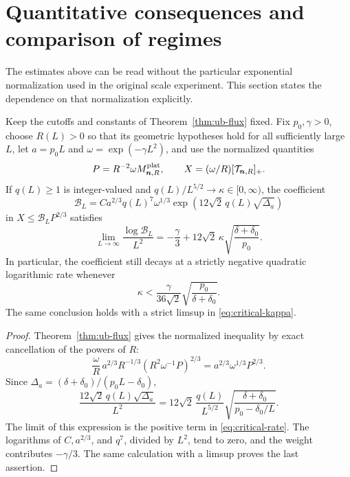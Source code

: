 \section{Quantitative consequences and comparison of regimes}
\label{sec:consequences}

The estimates above can be read without the particular exponential
normalization used in the original scale experiment. This section states
the dependence on that normalization explicitly.

\begin{corollary}
\label{cor:critical-coefficient}
Keep the cutoffs and constants of Theorem~\ref{thm:ub-flux} fixed.
Fix \(p_0,\gamma>0\), choose \(R(L)>0\) so that its geometric
hypotheses hold for all sufficiently large \(L\), let \(a=p_0L\) and
\(\omega=\exp(-\gamma L^2)\), and use the normalized quantities
\[
 P=R^{-2}\omega M^{\rm plat}_{\boldsymbol n,R},
 \qquad X=(\omega/R)[\mathcal T_{\boldsymbol n,R}]_+.
\]
If \(q(L)\ge1\) is integer-valued and
\(q(L)/L^{5/2}\to\kappa\in[0,\infty)\), the coefficient
\[
 \mathcal B_L
 =C a^{2/3}q(L)^7\omega^{1/3}
          \exp(12\sqrt2\,q(L)\sqrt{\Delta_a})
\]
in \(X\le\mathcal B_LP^{2/3}\) satisfies
\begin{equation}\label{eq:critical-rate}
 \lim_{L\to\infty}\frac{\log\mathcal B_L}{L^2}
 =-\frac{\gamma}{3}
       +12\sqrt2\,\kappa\sqrt{\frac{\delta+\delta_0}{p_0}}.
\end{equation}
In particular, the coefficient still decays at a strictly negative
quadratic logarithmic rate whenever
\begin{equation}\label{eq:critical-kappa}
 \kappa<
 \frac{\gamma}{36\sqrt2}
           \sqrt{\frac{p_0}{\delta+\delta_0}}.
\end{equation}
The same conclusion holds with a strict limsup in
\eqref{eq:critical-kappa}.
\end{corollary}

\begin{proof}
Theorem~\ref{thm:ub-flux} gives the normalized inequality by exact
cancellation of the powers of \(R\):
\[
 \frac{\omega}{R}\,
     a^{2/3}R^{-1/3}(R^2\omega^{-1}P)^{2/3}
 =a^{2/3}\omega^{1/3}P^{2/3}.
\]
Since \(\Delta_a=(\delta+\delta_0)/(p_0L-\delta_0)\),
\[
 \frac{12\sqrt2\,q(L)\sqrt{\Delta_a}}{L^2}
 =12\sqrt2\,\frac{q(L)}{L^{5/2}}
       \sqrt{\frac{\delta+\delta_0}{p_0-\delta_0/L}}.
\]
The limit of this expression is the positive term in
\eqref{eq:critical-rate}. The logarithms of \(C,a^{2/3}\), and \(q^7\),
divided by \(L^2\), tend to zero, and the weight contributes
\(-\gamma/3\). The same calculation with a limsup proves the last
assertion.
\end{proof}

